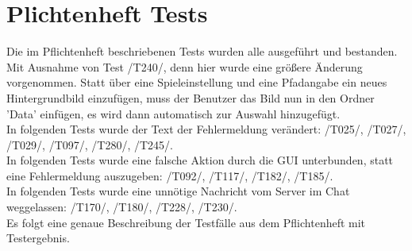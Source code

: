 \documentclass[a4paper]{article}
\begin{document}
	
\section{Plichtenheft Tests}
Die im Pflichtenheft beschriebenen Tests wurden alle ausgeführt und bestanden. Mit Ausnahme von Test /T240/, denn hier wurde eine größere Änderung vorgenommen. Statt über eine Spieleinstellung und eine Pfadangabe ein neues Hintergrundbild einzufügen, muss der Benutzer das Bild nun in den Ordner 'Data' einfügen, es wird dann automatisch zur Auswahl hinzugefügt.\\
In folgenden Tests wurde der Text der Fehlermeldung verändert: /T025/, /T027/, /T029/, /T097/, /T280/, /T245/.  \\
In folgenden Tests wurde eine falsche Aktion durch die GUI unterbunden, statt eine Fehlermeldung auszugeben: /T092/, /T117/, /T182/, /T185/.  \\
In folgenden Tests wurde eine unnötige Nachricht vom Server im Chat weggelassen: /T170/, /T180/, /T228/, /T230/.\\
Es folgt eine genaue Beschreibung der Testfälle aus dem Pflichtenheft mit Testergebnis.
\end{document}
